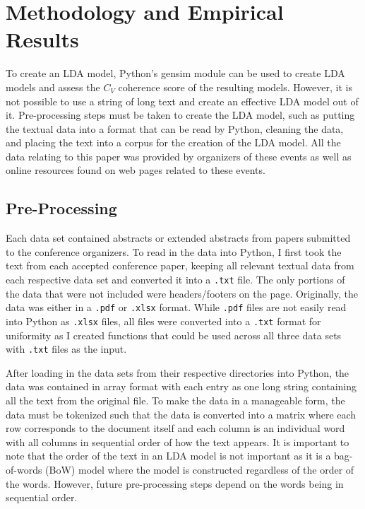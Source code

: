 \documentclass[a4paper, 12pt, twoside]{article}
\numberwithin{equation}{section} %
\begin{document}
\section{Methodology and Empirical Results}

To create an LDA model, Python's gensim module can be used to create LDA models and assess the $C_V$ coherence score of the resulting models. However, it is not possible to use a string of long text and create an effective LDA model out of it. Pre-processing steps must be taken to create the LDA model, such as putting the textual data into a format that can be read by Python, cleaning the data, and placing the text into a corpus for the creation of the LDA model. All the data relating to this paper was provided by organizers of these events as well as online resources found on web pages related to these events.

\subsection{Pre-Processing} 

Each data set contained abstracts or extended abstracts from papers submitted to the conference organizers. To read in the data into Python, I first took the text from each accepted conference paper, keeping all relevant textual data from each respective data set and converted it into a \texttt{.txt} file.  The only portions of the data that were not included were headers/footers on the page. Originally, the data was either in a \texttt{.pdf} or \texttt{.xlsx} format. While \texttt{.pdf} files are not easily read into Python as \texttt{.xlsx} files, all files were converted into a \texttt{.txt} format for uniformity as I created functions that could be used across all three data sets with \texttt{.txt} files as the input. 

After loading in the data sets from their respective directories into Python, the data was contained in array format with each entry as one long string containing all the text from the original file. To make the data in a manageable form, the data must be tokenized such that the data is converted into a matrix where each row corresponds to the document itself and each column is an individual word with all columns in sequential order of how the text appears. It is important to note that the order of the text in an LDA model is not important as it is a bag-of-words (BoW) model where the model is constructed regardless of the order of the words. However, future pre-processing steps depend on the words being in sequential order.
\end{document}
